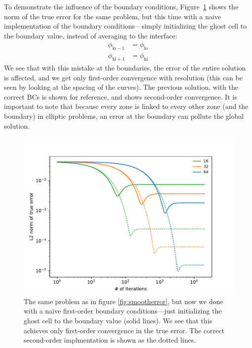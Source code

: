 To demonstrate the influence of the boundary conditions,
Figure~\ref{fig:smooth-badbcs} shows the norm of the true error for
the same problem, but this time with a naive implementation of the
boundary conditions---simply initializing the ghost cell to the
boundary value, instead of averaging to the interface:
\begin{align}
\phi_\mathrm{lo-1} &= \phi_\mathrm{lo} \\
\phi_\mathrm{hi+1} &= \phi_\mathrm{hi} 
\end{align}
We see that with this mistake at the boundaries, the error of the
entire solution is affected, and we get only first-order convergence
with resolution (this can be seen by looking at the spacing of the
curves).  The previous solution, with the correct BCs is shown for
reference, and shows second-order convergence.  It is important to
note that because every zone is linked to every other zone (and the
boundary) in elliptic problems, an error at the boundary can pollute the
global solution.

\begin{figure}
\centering
\includegraphics[width=\linewidth]{smooth-badBCs}
\caption[Convergence of smoothing in first-order BCs]{\label{fig:smooth-badbcs} 
  The same problem as in figure \ref{fig:smootherror}, but
  now we done with a naive first-order boundary conditions---just initializing
  the ghost cell to the boundary value (solid lines).  We see that this 
  achieves only first-order convergence in the true error.  The correct
  second-order implmentation is shown as the dotted lines.
  \\ }
\end{figure}


